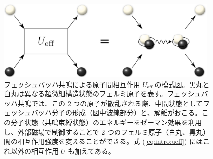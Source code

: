 \begin{figure}[t]
\centering
\includegraphics[width=110mm]{eps/feshbach-reso.eps}
\caption{フェッシュバッハ共鳴による原子間相互作用 $U_{\text{eff}}$ の模式図。黒丸と白丸は異なる超微細構造状態のフェルミ原子を表す。フェッシュバッハ共鳴では、この 2 つの原子が散乱される際、中間状態としてフェッシュバッハ分子の形成（図中波線部分）と、解離がおこる。この分子状態（共鳴束縛状態）のエネルギーをゼーマン効果を利用し、外部磁場で制御することで 2 つのフェルミ原子（白丸、黒丸）間の相互作用強度を変えることができる。式 (\ref{eq:intro:ueff}) にはこれ以外の相互作用 $U$ も加えてある。
}
\label{fig:feshbach}
\end{figure}

